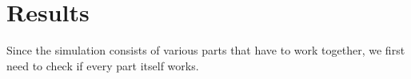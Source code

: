 \documentclass[12pt]{article}
\begin{document}






\newpage
\section{Results}
Since the simulation consists of various parts that have to work together, we first need to check if every part itself works.\\
\end{document}
